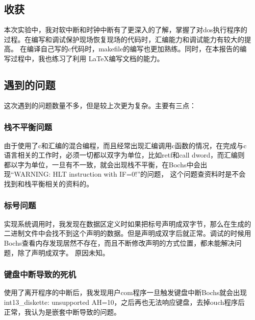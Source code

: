 \documentclass[a4paper, 11pt]{article} %
\begin{document}
\subsection{收获}

本次实验中，我对软中断和时钟中断有了更深入的了解，掌握了对dos执行程序的过程。在编写和调试保护现场恢复现场的代码时，汇编能力和调试能力有较大的提高。
在编译自己写的c代码时，makefile的编写也更加熟练\cite{makefile}。同时，在本报告的编写过程中，我也练习了利用 \LaTeX 编写文档的能力。\cite{lamport94, cite}

\subsection{遇到的问题}
这次遇到的问题数量不多，但是较上次更为复杂。主要有三点：
\subsubsection{栈不平衡问题}
由于使用了c和汇编的混合编程，而且经常出现汇编调用c函数的情况，在完成与c语言相关的工作时，必须一切都以双字为单位，比如retf和call dword，而汇编则都以字为单位，一旦有不一致，就会出现栈不平衡，在Bochs中会出现“WARNING: HLT instruction with IF=0!”的问题，
这个问题查资料时是不会找到和栈平衡相关的资料的。
\subsubsection{标号问题}
实现系统调用时，我发现在数据区定义时如果把标号声明成双字节，那么在生成的二进制文件中会找不到这个声明的数据。但是声明成双字后就正常。调试的时候用Bochs查看内存发现居然不存在，而且不断修改声明的方式位置，都未能解决问题，除了声明成双字。
原因未知。
\subsubsection{键盘中断导致的死机}
使用了离开程序的中断后，我发现用户com程序一旦触发键盘中断Bochs就会出现int13\_diskette: unsupported AH=10，之后再也无法响应键盘，去掉ouch程序后正常，我认为是嵌套中断导致的问题。
\end{document}
